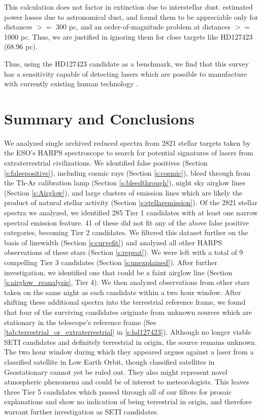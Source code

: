 \documentclass[twocolumn]{aastex701}
\begin{document}
This calculation does not factor in extinction due to interstellar dust.  \cite{Hippke_2018} estimated power losses due to astronomical dust, and found them to be appreciable only for distances $>=$ 300 pc, and an order-of-magnitude problem at distances $>=$ 1000 pc.  Thus, we are justified in ignoring them for close targets like HD127423 (68.96 pc).

Thus, using the HD127423 candidate as a benchmark, we find that this survey has a sensitivity capable of detecting lasers which are possible to manufacture with currently existing human technology \citep{Lander1997ContinuouswaveCD}.

\section{Summary and Conclusions}
We analyzed single archived reduced spectra from 2821 stellar targets taken by the ESO’s HARPS spectroscope to search for potential signatures of lasers from extraterrestrial civilizations. We identified false positives (Section \ref{s:falsepositive}), including cosmic rays (Section \ref{s:cosmic}), bleed through from the Th-Ar calibration lamp (Section \ref{s:bleedthrough}), night sky airglow lines (Section \ref{s:Airglow}), and large clusters of emission lines which are likely the product of natural stellar activity (Section \ref{s:stellaremission}). Of the 2821 stellar spectra we analyzed, we identified 285 Tier 1 candidates with at least one narrow spectral emission feature.  41 of these did not fit any of the above false positive categories, becoming Tier 2 candidates. We filtered this dataset further on the basis of linewidth (Section \ref{s:curvefit}) and analyzed all other HARPS observations of these stars (Section \ref{s:repeat}). We were left with a total of 9 compelling Tier 3 candidates (Section \ref{s:unexplained}). After further investigation, we identified one that could be a faint airglow line (Section \ref{s:airglow_reanalysis}, Tier 4). We then analyzed observations from other stars taken on the same night as each candidate within a two hour window. After shifting these additional spectra into the terrestrial reference frame, we found that four of the surviving candidates originate from unknown sources which are stationary in the telescope's reference frame (See 
\ref{tab:terrestrial_or_extraterrestrial} in \ref{s:hd127423}). Although no longer viable SETI candidates and definitely terrestrial in origin, the source remains unknown. The two hour window during which they appeared argues against a laser from a classified satellite in Low Earth Orbit, though classified satellites in Geostationary cannot yet be ruled out. They also might represent novel atmospheric phenomena and could be of interest to meteorologists. This leaves three Tier 5 candidates which passed through all of our filters for prosaic explanations and show no indication of being terrestrial in origin, and therefore warrant further investigation as SETI candidates.
\end{document}
